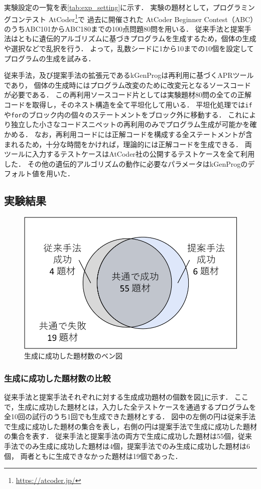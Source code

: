 \documentclass[uplatex,dvipdfmx,a4paper]{jsarticle}
\begin{document}
実験設定の一覧を表\ref{tab:exp_setting}に示す．
実験の題材として，プログラミングコンテスト AtCoder\footnote{\url{https://atcoder.jp/}}で
過去に開催された AtCoder Beginner Contest（ABC）のうちABC101からABC180までの100点問題80問を用いる．
従来手法と提案手法はともに遺伝的アルゴリズムに基づきプログラムを生成するため，個体の生成や選択などで乱択を行う．
よって，乱数シードに1から10までの10個を設定してプログラムの生成を試みる．

従来手法，及び提案手法の拡張元であるkGenProgは再利用に基づくAPRツールであり，
個体の生成時にはプログラム改変のために改変元となるソースコードが必要である．
この再利用ソースコード片としては実験題材80問の全ての正解コードを取得し，そのネスト構造を全て平坦化して用いる．
平坦化処理では\texttt{if}や\texttt{for}のブロック内の個々のステートメントをブロック外に移動する．
これにより独立した小さなコードスニペットの再利用のみでプログラム生成が可能かを確かめる．
なお，再利用コードには正解コードを構成する全ステートメントが含まれるため，十分な時間をかければ，理論的には正解コードを生成できる．
両ツールに入力するテストケースはAtCoder社の公開するテストケースを全て利用した．
その他の遺伝的アルゴリズムの動作に必要なパラメータはkGenProgのデフォルト値を用いた．

\subsection{実験結果}
\begin{figure}[t]
  \centering
  \includegraphics[width=0.8\linewidth]{fig/venn.pdf}
  \caption{生成に成功した題材数のベン図}
  \label{fig:venn}
\end{figure}

\subsubsection{生成に成功した題材数の比較}
従来手法と提案手法それぞれに対する生成成功題材の個数を図\ref{fig:venn}に示す．
ここで，生成に成功した題材とは，入力した全テストケースを通過するプログラムを全10回の試行のうち1回でも生成できた題材とする．
図中の左側の円は従来手法で生成に成功した題材の集合を表し，右側の円は提案手法で生成に成功した題材の集合を表す．
従来手法と提案手法の両方で生成に成功した題材は55個，従来手法でのみ生成に成功した題材は4個，提案手法でのみ生成に成功した題材は6個，
両者ともに生成できなかった題材は19個であった．
\end{document}
